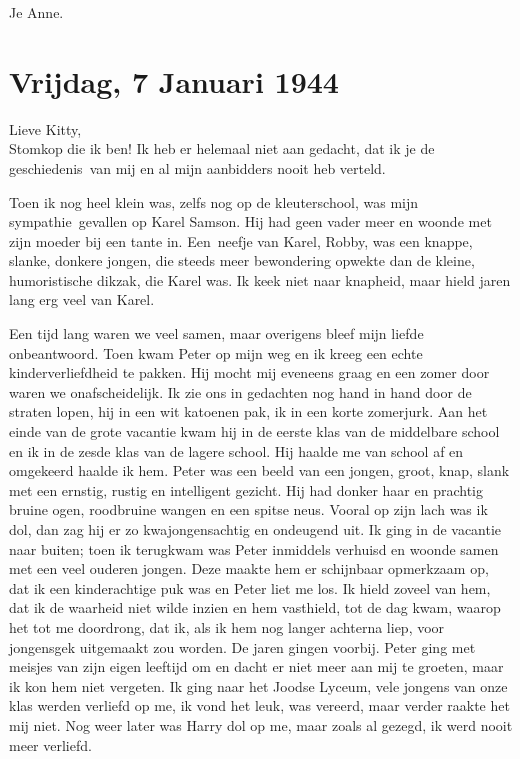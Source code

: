 \documentclass{book}
\begin{document}
Je Anne.

\section*{Vrijdag, 7 Januari 1944}

Lieve Kitty,\\
Stomkop die ik ben! Ik heb er helemaal niet aan gedacht, dat ik
je de geschiedenis~van mij en al mijn aanbidders nooit heb verteld.

Toen ik nog heel klein was, zelfs nog op de kleuterschool, was mijn
sympathie~gevallen op Karel Samson. Hij had geen vader meer en woonde met zijn
moeder bij een tante in. Een~neefje van Karel, Robby, was een knappe, slanke,
donkere jongen, die steeds meer bewondering opwekte dan de kleine, humoristische
dikzak, die Karel was. Ik keek niet naar knapheid, maar hield jaren lang erg
veel van Karel.

Een tijd lang waren we veel samen, maar overigens bleef mijn liefde
onbeantwoord. Toen kwam Peter op mijn weg en ik kreeg een echte
kinderverliefdheid te pakken. Hij mocht mij eveneens graag en een zomer door
waren we onafscheidelijk. Ik zie ons in gedachten nog hand in hand door de
straten lopen, hij in een wit katoenen pak, ik in een korte zomerjurk. Aan het
einde van de grote vacantie kwam hij in de eerste klas van de middelbare school
en ik in de zesde klas van de lagere school. Hij haalde me van school af en
omgekeerd haalde ik hem. Peter was een beeld van een jongen, groot, knap, slank
met een ernstig, rustig en intelligent gezicht. Hij had donker haar en prachtig
bruine ogen, roodbruine wangen en een spitse neus. Vooral op zijn lach was ik
dol, dan zag hij er zo kwajongensachtig en ondeugend uit. Ik ging in de vacantie
naar buiten; toen ik terugkwam was Peter inmiddels verhuisd en woonde samen met
een veel ouderen jongen. Deze maakte hem er schijnbaar opmerkzaam op, dat ik een
kinderachtige puk was en Peter liet me los. Ik hield zoveel van hem, dat ik de
waarheid niet wilde inzien en hem vasthield, tot de dag kwam, waarop het tot me
doordrong, dat ik, als ik hem nog langer achterna liep, voor jongensgek
uitgemaakt zou worden. De jaren gingen voorbij. Peter ging met meisjes van zijn
eigen leeftijd om en dacht er niet meer aan mij te groeten, maar ik kon hem niet
vergeten.  Ik ging naar het Joodse Lyceum, vele jongens van onze klas werden
verliefd op me, ik vond het leuk, was vereerd, maar verder raakte het mij niet.
Nog weer later was Harry dol op me, maar zoals al gezegd, ik werd nooit meer
verliefd.
\end{document}
